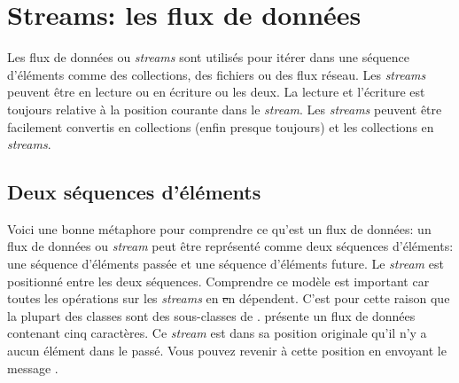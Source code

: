 \documentclass[a4paper,10pt,twoside]{book}
\begin{document}
	\renewcommand{\nnbb}[2]{} %
	\sloppy
\fi
\newcommand{\stream}{\emph{stream}\xspace}
\newcommand{\streams}{\emph{streams}\xspace}
\chapter{Streams: les flux de données}


Les flux de données ou \streams sont utilisés pour itérer dans
une séquence d'éléments comme des
collections, des fichiers ou des flux réseau.
Les \streams peuvent être en lecture ou en écriture ou les deux.
La lecture et l'écriture est toujours relative à la position courante
dans le \stream. Les \streams peuvent être facilement convertis en
collections 
(enfin presque toujours)
et les collections en \streams.

\section{Deux séquences d'éléments}
Voici une bonne métaphore pour comprendre ce qu'est un flux de données:
un flux de données ou \stream peut être représenté comme deux
séquences d'éléments: une séquence d'éléments passée 
et une séquence d'éléments future.
Le \stream est positionné entre les deux séquences.
Comprendre ce modèle est important car toutes les opérations
sur les \streams en \st en dépendent.
C'est pour cette raison que la plupart des
classes  sont des sous-classes de .
 présente un flux de données contenant cinq caractères.
Ce \stream est dans sa position originale \ie qu'il n'y a aucun élément
dans le passé. Vous pouvez revenir à cette position en envoyant le message 
.
\end{document}
